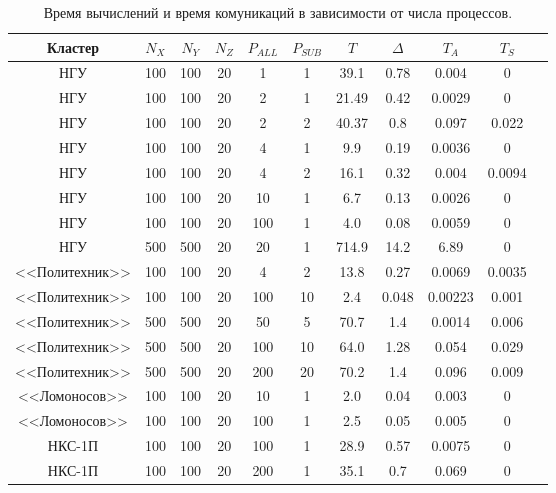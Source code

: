 \begin{table}[ht]
\begin{center}
\caption{Время вычислений и время комуникаций в зависимости от числа  процессов.}
\begin{tabular}{|c|c|c|c|c|c|c|c|c|c|c|}
\hline			
Кластер & $N_X$ & $N_Y$ & $N_Z$ &$P_{ALL}$  & $P_{SUB}$ & $T$ & $\Delta$ & $T_{A}$ &  $T_{S}$ \\\hline
НГУ     & 100   & 100   & 20    &  1        & 1         & 39.1  & 0.78 & 0.004         & 0          \\\hline
НГУ     & 100   & 100   & 20    &  2        & 1         & 21.49 & 0.42 & 0.0029         & 0         \\\hline
НГУ     & 100   & 100   & 20    &  2        & 2         & 40.37 & 0.8 & 0.097         & 0.022       \\\hline
НГУ     & 100   & 100   & 20    &  4        & 1         & 9.9 & 0.19 & 0.0036         & 0           \\\hline
НГУ     & 100   & 100   & 20    &  4        & 2         & 16.1 & 0.32 & 0.004         & 0.0094      \\\hline
НГУ     & 100   & 100   & 20    &  10       & 1         & 6.7 & 0.13 & 0.0026         & 0      \\\hline
НГУ     & 100   & 100   & 20    &  100      & 1         & 4.0   & 0.08 & 0.0059         & 0      \\\hline
НГУ     & 500   & 500   & 20    &  20       & 1         & 714.9 & 14.2 & 6.89         & 0      \\\hline
<<Политехник>> & 100   & 100   & 20    &  4       & 2         & 13.8 & 0.27 & 0.0069         & 0.0035      \\\hline
<<Политехник>> & 100   & 100   & 20    &  100     & 10        & 2.4 & 0.048 & 0.00223        & 0.001      \\\hline
<<Политехник>> & 500   & 500   & 20    &  50       & 5        & 70.7 & 1.4 & 0.0014         & 0.006      \\\hline
<<Политехник>> & 500   & 500   & 20    &  100       & 10      & 64.0 & 1.28 & 0.054         & 0.029      \\\hline
<<Политехник>> & 500   & 500   & 20    &  200       & 20      & 70.2 & 1.4 & 0.096          & 0.009      \\\hline
<<Ломоносов>> & 100   & 100   & 20    &  10       & 1         & 2.0 & 0.04 & 0.003         & 0      \\\hline
<<Ломоносов>> & 100   & 100   & 20    &  100       & 1        & 2.5 & 0.05 & 0.005         & 0      \\\hline
НКС-1П        & 100   & 100   & 20    &  100       & 1        & 28.9 & 0.57 & 0.0075         & 0      \\\hline
НКС-1П        & 100   & 100   & 20    &  200       & 1        & 35.1 & 0.7 & 0.069         & 0      \\\hline

\end{tabular}
\end{center}
\end{table}
